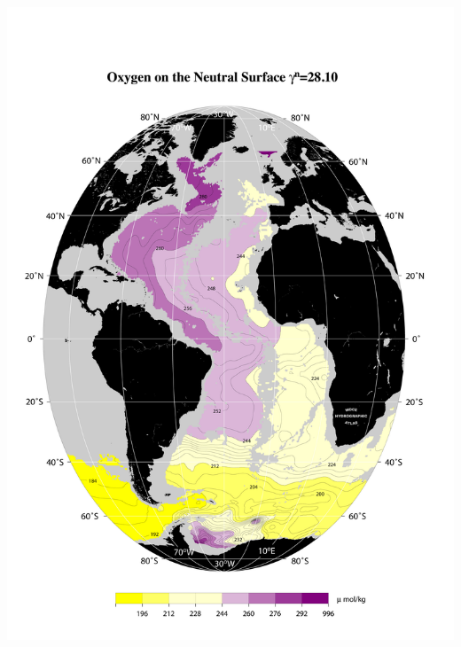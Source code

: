 \documentclass{beamer}
\begin{document}
\begin{frame}[plain,t]
\begin{columns}
\begin{column}{0.5\textwidth}
          \includegraphics[width=\textwidth]{oxygen_isopyc_jpg/gam2810_oxy.jpg}  
      \end{column}
    \end{columns} 
\end{frame}
\end{document}
